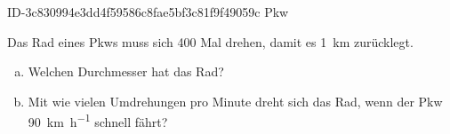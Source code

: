 \begin{exercise}
      {ID-3c830994e3dd4f59586c8fae5bf3c81f9f49059c}
      {Pkw}
  \ifproblem\problem\par
    Das Rad eines Pkws muss sich \num{400} Mal drehen,
    damit es \SI{1}{\kilo\metre} zurücklegt.
    \begin{enumerate}[a)]
      \item Welchen Durchmesser hat das Rad?
      \item Mit wie vielen Umdrehungen pro Minute
            dreht sich das Rad, wenn der Pkw
            \SI{90}{\kilo\metre\per\hour}
            schnell fährt?
    \end{enumerate}
  \fi
\end{exercise}
